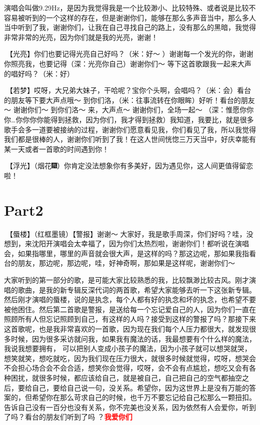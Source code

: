 \documentclass[
]{book}
\begin{document}
演唱会叫做9.29Hz，是因为我觉得我是一个比较渺小、比较特殊、或者说是比较不容易被听到的一个这样的存在，但是谢谢你们，能够在那么多声音当中，那么多人当中听到了我，谢谢你们，让我在自己寻找自己的路上，没有那么的黑暗，我觉得非常非常的光亮，因为你们就是我的光亮，谢谢！

🎵【光亮】你们也要记得光亮自己好吗？（米：好～ ）谢谢每一个发光的你，谢谢你照亮我，也要记得（深：光亮你自己）谢谢你们～
等下这首歌跟我一起来大声的唱好吗？（米：好）

🎵【若梦】哎呀，大兄弟大妹子，干哈呢？宝你个头啊，会唱吗？（米：会）看台的朋友等下要大声点哦～ 到你们洛，（米：往事流转在你眼眸）好听！看台的朋友～ 谢谢你们～ 到你们洛～ 来，大声点～ 谢谢你们，全场一起～ （深：惟愿你你你\ldots 你你你你能得到拯救，因为你们，我才得到拯救）我知道，我要比，就是很多歌手会多一道要被接纳的过程，谢谢你们愿意看见我，你们看见了我，所以我觉得我们都是很棒的人，谢谢你们听到了我！在这人世间恍惚三万天当中，好庆幸能有某一天或者一首歌的时间遇到你！

🎵【浮光】（烟花🎆）你肯定没法想象你有多美好，因为遇见你，这人间更值得留恋啦！

\section{Part2}\label{shenyang-20240907-part2}

🎵【蜃楼】（红框墨镜）【警报】谢谢～
大家好，我是歌手周深，你们好吗？哇，没想到，来沈阳开演唱会太幸福了，因为你们太热烈啦，谢谢你们！都听说在演唱会，如果指哪里，哪里的声音就会很大声，是这样的吗？那这边呢，那如果我指看台的朋友，那边呢，那边呢，哇，好神奇啊，那如果是这样呢，谢谢你们～

大家听到的第一部分的歌，是可能大家比较熟悉的我，比较飘渺比较古风。刚才演唱的歌曲，是我的新专辑反深代词的两首歌，希望大家能够去听一下这张新专辑。然后刚才演唱的蜃楼，说的是执念，每个人都有好的执念和坏的执念，也希望不要被他困住。然后第二首歌是警报，是送给每一个忘记爱自己的人，因为你们一直在照顾所有人但忘记照顾到自己，有这样的人吗？接受到这样的警报了吗？那接下来这首歌呢，也是我非常喜欢的一首歌，因为现在我们每个人压力都很大，就发现很多时候，因为很多采访就问我，如果我有魔法的话，我最想要有个什么样的魔法，我说我想要拥有， 可以把别人变成小孩子的魔法，因为小孩子就可以想哭就哭，想笑就笑，想吃就吃，因为我们现在压力很大，就很多时候就觉得，哎呀，想哭会不会担心场合会不会合适，想笑你会觉得，哎呀，会不会有点尴尬，想吃又会有各种困扰，就很多时候，都应该给自己，就是被自己，自己把自己的空气都抽空之后，要给自己，要给自己说一句，没关系。希望你，因为这世界上是没有万能的答案的，但希望你在那么苛求自己的时候，也千万不要忘记给自己松那么一颗扭扣。告诉自己没有一百分也没有关系，你不完美也没关系，因为依然有人会爱你，听到了吗？看台的朋友们听到了吗 ？\textbf{\textcolor{red}{我爱你们~} }
\end{document}
